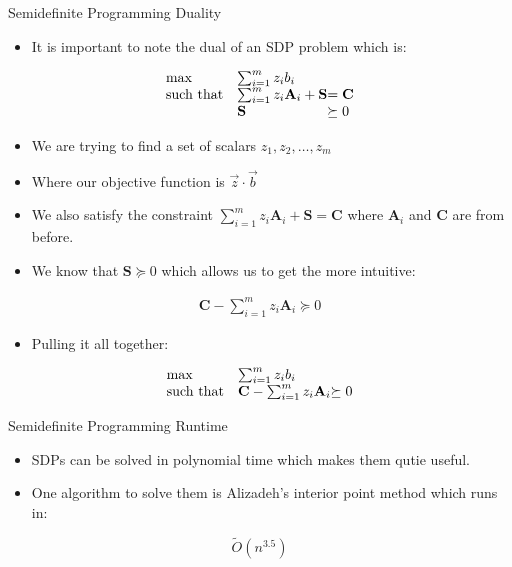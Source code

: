 \documentclass[
	11pt, %
]{beamer}
\begin{document}
\begin{frame}[label={sec:org94c0d68}]{Semidefinite Programming Duality}
\begin{itemize}
\item It is important to note the dual of an SDP problem which is:
\end{itemize}
\begin{align*}
  \begin{array}{ll@{}ll}
    \max              & \sum_{i=1}^m z_i b_i                              & \\
    \text{such that}  & \sum_{i=1}^m z_i \mathbf{A}_{i} + \mathbf{S} &= \mathbf{C} \\
                    & \mathbf{S}                      &\succeq 0
  \end{array}
\end{align*}
\pause
\begin{itemize}
\item We are trying to find a set of scalars \(z_1, z_2, \ldots, z_m\)
\item Where our objective function is \(\vec{z} \cdot \vec{b}\)
\item We also satisfy the constraint \(\sum_{i=1}^m z_i \mathbf{A}_{i} + \mathbf{S} = \mathbf{C}\) where \(\mathbf{A}_i\) and \(\mathbf{C}\) are from before.
\end{itemize}
\pause
\begin{itemize}
\item We know that \(\mathbf{S} \succeq 0\) which allows us to get the more intuitive:
\end{itemize}
\begin{align*}
\mathbf{C} - \sum_{i = 1}^m z_i \mathbf{A}_i \succeq 0
\end{align*}

\begin{itemize}
\item Pulling it all together:
\end{itemize}
\begin{align*}
  \begin{array}{ll@{}ll}
    \max              & \sum_{i=1}^m z_i b_i                              & \\
    \text{such that}  & \mathbf{C} - \sum_{i = 1}^m z_i \mathbf{A}_i &\succeq 0 \\
  \end{array}
\end{align*}
\end{frame}

\begin{frame}[label={sec:org25d1b18}]{Semidefinite Programming Runtime}
\begin{itemize}
\item SDPs can be solved in polynomial time which makes them qutie useful.
\item One algorithm to solve them is Alizadeh's interior point method which runs in:
\end{itemize}
\[
\tilde{O}(n^{3.5})
\]
\end{frame}
\end{document}
